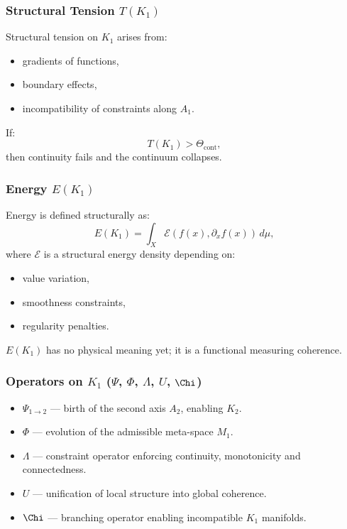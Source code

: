 \subsubsection{Structural Tension \texorpdfstring{$T(K_1)$}{T(K_1)}}

Structural tension on $K_1$ arises from:
\begin{itemize}
    \item gradients of functions,
    \item boundary effects,
    \item incompatibility of constraints along $A_1$.
\end{itemize}

If:
\[
T(K_1) > \Theta_{\mathrm{cont}},
\]
then continuity fails and the continuum collapses.

\subsubsection{Energy \texorpdfstring{$E(K_1)$}{E(K_1)}}

Energy is defined structurally as:
\[
E(K_1) = \int_X \mathcal{E}(f(x), \partial_x f(x))\, d\mu,
\]
where $\mathcal{E}$ is a structural energy density depending on:
\begin{itemize}
    \item value variation,
    \item smoothness constraints,
    \item regularity penalties.
\end{itemize}

$E(K_1)$ has no physical meaning yet; it is a functional measuring
coherence.

\subsubsection{Operators on \texorpdfstring{$K_1$}{K_1} (\texorpdfstring{$\Psi$}{\Psi}, \texorpdfstring{$\Phi$}{\Phi}, \texorpdfstring{$\Lambda$}{\Lambda}, \texorpdfstring{$U$}{U}, \texorpdfstring{$\Chi$}{\Chi})}

\begin{itemize}
    \item $\Psi_{1\to2}$ — birth of the second axis $A_2$, enabling
          $K_2$.
    \item $\Phi$ — evolution of the admissible meta-space $M_1$.
    \item $\Lambda$ — constraint operator enforcing continuity,
          monotonicity and connectedness.
    \item $U$ — unification of local structure into global coherence.
    \item $\Chi$ — branching operator enabling incompatible $K_1$
          manifolds.
\end{itemize}

